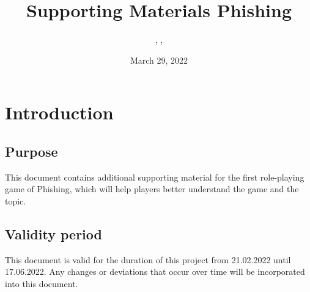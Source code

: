 \documentclass{../../../extra/styles/SecureRole}
\title{Supporting Materials Phishing}
\author{\Ba, \Wi, \Zm}
\date{March 29, 2022}
\begin{document}
\makecover
\newpage

\tableofcontents
\newpage

\chapter{Introduction}

\section{Purpose}
This document contains additional supporting material for the first role-playing game of Phishing, which will help players better understand the game and the topic.

\section{Validity period}

This document is valid for the duration of this project from 21.02.2022 until 17.06.2022. Any changes or deviations that occur over time will be incorporated into this document.


\end{document}
